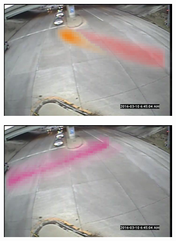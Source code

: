 \begin{figure}
    \begin{subfigure}{0.32\linewidth}
        \includegraphics[width=\linewidth]{./img/scene_learning/topics/topic-1.jpg}
    \end{subfigure}%
    \begin{subfigure}{0.32\linewidth}
        \includegraphics[width=\linewidth]{./img/scene_learning/topics/topic-4.jpg}
    \end{subfigure}%
    \hspace{0.08\linewidth}
    \begin{subfigure}{0.16\linewidth}

\end{subfigure}
\end{figure}
